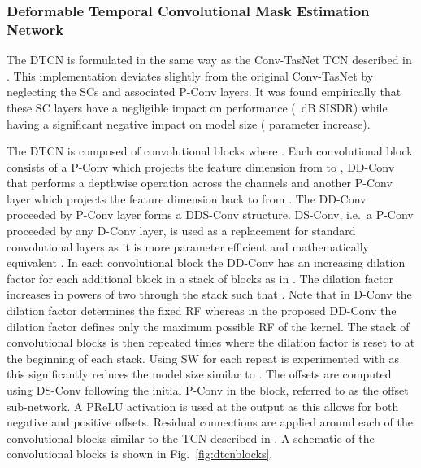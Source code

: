 \documentclass{article}
\begin{document}
\subsubsection{Deformable Temporal Convolutional Mask Estimation Network}
The \ac{DTCN} is formulated in the same way as the Conv-TasNet \ac{TCN} described in \cite{atttasnet}. This implementation deviates slightly from the original Conv-TasNet \cite{convtasnet} by neglecting the \acp{SC} and associated \ac{P-Conv} layers. It was found empirically that these \ac{SC} layers have a negligible impact on performance (~dB \ac{SISDR}) while having a significant negative impact on model size ( parameter increase).

The \ac{DTCN} is composed of  convolutional blocks where  \cite{atttasnet}. Each convolutional block consists of a \ac{P-Conv} which projects the feature dimension from  to , \ac{DD-Conv} that performs a depthwise operation across the  channels and another \ac{P-Conv} layer which projects the feature dimension back to  from . The \ac{DD-Conv} proceeded by \ac{P-Conv} layer forms a \ac{DDS-Conv} structure. \Ac{DS-Conv}, i.e.~a \ac{P-Conv} proceeded by any \ac{D-Conv} layer, is used as a replacement for standard convolutional layers as it is more parameter efficient and mathematically equivalent \cite{convtasnet}. In each convolutional block the \ac{DD-Conv} has an increasing dilation factor  for each additional block in a stack of  blocks as in \cite{atttasnet,convtasnet}. The dilation factor  increases in powers of two through the stack such that . Note that in \ac{D-Conv} the dilation factor determines the fixed \ac{RF} whereas in the proposed \ac{DD-Conv} the dilation factor defines only the maximum possible \ac{RF} of the kernel. The stack of  convolutional blocks is then repeated  times where the dilation factor is reset to  at the beginning of each stack. Using \ac{SW} for each repeat is experimented with as this significantly reduces the model size similar to \cite{furcanext}. The offsets  are computed using \ac{DS-Conv} following the initial \ac{P-Conv} in the block, referred to as the offset sub-network. A \ac{PReLU} activation is used at the output as this allows for both negative and positive offsets. Residual connections are applied around each of the convolutional blocks similar to the \ac{TCN} described in \cite{atttasnet}. A schematic of the convolutional blocks is shown in Fig.~\ref{fig:dtcnblocks}.
\end{document}
